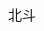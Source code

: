 \documentclass{standalone}
\begin{document}
\begin{CJK}{UTF8}{gbsn}
	
	北斗
	
\end{CJK}
\end{document}
